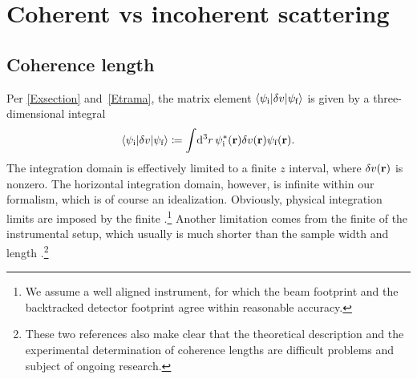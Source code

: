 \section{Coherent vs incoherent scattering}\label{Scoherlen}

\subsection{Coherence length}

Per \cref{Exsection} and~\cref{Etrama},
%
the matrix element $\braket{\psi_{\text{i}}|\delta v|\psi_{\text{f}}}$
is given by a three-dimensional integral
\begin{equation}\label{Etrama3}
  \braket{\psi_{\text{i}}|\delta v|\psi_{\text{f}}}
  \coloneqq  \int\!\mathrm d^3r\, \psi^{*}_{\text{i}}(\mathbf{r})\delta v(\mathbf{r})\psi_{\text{f}}(\mathbf{r}).
\end{equation}
The integration domain is effectively limited to a finite $z$ interval,
where $\delta v(\mathbf{r})$ is nonzero.
The horizontal integration domain, however, is infinite
within our formalism,
which is of course an idealization.
Obviously, physical integration limits are imposed by the finite
%
.\footnote
{We assume a well aligned instrument,
for which the beam footprint and the backtracked detector footprint
%
%
%
agree within reasonable accuracy.}
Another limitation comes from the finite 
of the instrumental setup,
which usually is much shorter than the sample width and length
\cite{HaPR10,MaMM14}.\footnote
{These two references also make clear that
  the theoretical description and the experimental determination of
  coherence lengths are difficult problems and subject of ongoing research.}

